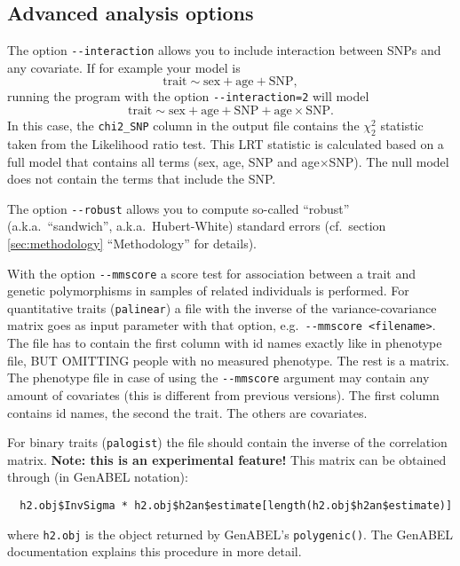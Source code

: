 \documentclass[12pt,a4paper]{article}
\begin{document}
\subsection{Advanced analysis options}
The option \lstinline{--interaction} allows you to include interaction
between SNPs and any covariate. If for example your model is
\begin{equation*}
  \textrm{trait} \sim \textrm{sex} + \textrm{age} + \textrm{SNP},
\end{equation*}
running the program with the option \lstinline{--interaction=2} will model
\begin{equation*}
  \textrm{trait} \sim \textrm{sex} + \textrm{age} + \textrm{SNP} +
  \textrm{age} \times \mathrm{SNP}.
\end{equation*}
In this case, the \texttt{chi2_SNP} column in the output file contains
the $\chi_2^2$ statistic taken from the Likelihood ratio test. This
LRT statistic is calculated based on a full model that contains all
terms (sex, age, SNP and age$\times$SNP). The null model does not
contain the terms that include the SNP.

The option \lstinline{--robust} allows you to compute so-called
``robust'' (a.k.a.~``sandwich'', a.k.a.~Hubert-White) standard errors
(cf.~section \ref{sec:methodology} ``Methodology'' for details).

With the option \lstinline{--mmscore} a score test for association
between a trait and genetic polymorphisms in samples of related
individuals is performed. For quantitative traits (\texttt{palinear})
a file with the inverse of the variance-covariance matrix goes as input
parameter with that option, e.g.~\lstinline{--mmscore <filename>}. The
file has to contain the first column with id names exactly like in
phenotype file, BUT OMITTING people with no measured phenotype. The
rest is a matrix. The phenotype file in case of using the
\lstinline{--mmscore} argument may contain any amount of covariates (this
is different from previous versions). The first column contains id
names, the second the trait. The others are covariates.

For binary traits (\texttt{palogist}) the file should contain the
inverse of the correlation matrix. \textbf{Note: this is an
  experimental feature!} This matrix can be obtained through (in
GenABEL notation):
\begin{verbatim}
  h2.obj$InvSigma * h2.obj$h2an$estimate[length(h2.obj$h2an$estimate)]
\end{verbatim}
where \texttt{h2.obj} is the object returned by GenABEL's
\texttt{polygenic()}. The GenABEL documentation explains this
procedure in more detail.
\end{document}
